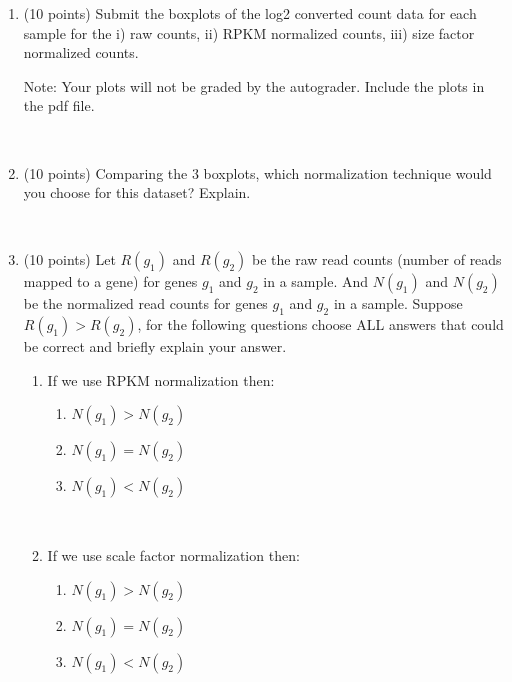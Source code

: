 \begin{enumerate}
\item (10 points) Submit the boxplots of the log2 converted count data for each sample for the i) raw counts, ii) RPKM normalized counts, iii) size factor normalized counts. 

Note: Your plots will not be graded by the autograder. Include the plots in the pdf file. 


\begin{solution}
~
\end{solution}


\item (10 points) Comparing the 3 boxplots, which normalization technique would you choose for this dataset? Explain.

\begin{solution}
~
\end{solution}

\item (10 points) Let $R(g_1)$ and $R(g_2)$ be the raw read counts (number of reads mapped to a gene) for genes $g_1$ and $g_2$ in a sample. And $N(g_1)$ and $N(g_2)$ be the normalized read counts for genes $g_1$ and $g_2$ in a sample. Suppose $R(g_1) > R(g_2)$, for the following questions choose ALL answers that could be correct and briefly explain your answer.

\begin{enumerate}
    \item If we use RPKM normalization then:
    \begin{enumerate}
        \item $N(g_1) > N(g_2)$
        \item $N(g_1) = N(g_2)$
        \item $N(g_1) < N(g_2)$
        \begin{solution}
	~
        \end{solution}
    \end{enumerate}

    \item If we use scale factor normalization then:
    \begin{enumerate}
        \item $N(g_1) > N(g_2)$
        \item $N(g_1) = N(g_2)$
        \item $N(g_1) < N(g_2)$
        \begin{solution}
	~
        \end{solution}

    \end{enumerate}
\end{enumerate}



\end{enumerate}
